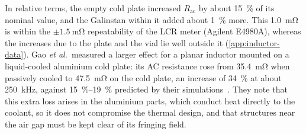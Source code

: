 In relative terms, the empty cold plate increased $R_{\mathrm{ac}}$ by about
\SI{15}{\percent} of its nominal value, and the Galinstan within it added about
\SI{1}{\percent} more. This \SI{1.0}{\milli\ohm} is within the
$\pm\SI{1.5}{\milli\ohm}$ repeatability of the LCR meter (Agilent E4980A), whereas the increases due to the plate and
the vial lie well outside it (\cref{app:inductor-data}). Gao \emph{et al.}\ measured a larger effect for a planar
inductor mounted on a liquid-cooled aluminium cold plate: its AC resistance rose
from \SI{35.4}{\milli\ohm} when passively cooled to \SI{47.5}{\milli\ohm} on the
cold plate, an increase of \SI{34}{\percent} at about \SI{250}{\kilo\hertz},
against \SIrange{15}{19}{\percent} predicted by their simulations~\cite{gao_modeling_2022}.
They note that this extra loss arises in the aluminium parts, which conduct
heat directly to the coolant, so it does not compromise the thermal design, and
that structures near the air gap must be kept clear of its fringing field.


